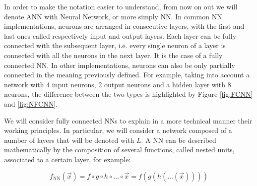 In order to make the notation easier to understand, from now on out we will denote ANN with Neural Network, or more simply NN. In common NN implementations, neurons are arranged in consecutive layers, with the first and last ones called respectively input and output layers. Each layer can be fully connected with the subsequent layer, i.e. every single neuron of a layer is connected with all the neurons in the next layer. It is the case of a fully connected NN. In other implementations, neurons can also be only partially connected in the meaning previously defined. For example, taking into account a network with 4 input neurons, 2 output neurons and a hidden layer with 8 neurons, the difference between the two types is highlighted by Figure \ref{fig:FCNN} and \ref{fig:NFCNN}.

\vspace{5mm}
\begin{minipage}[b]{0.45\linewidth}
    \centering
    
    \label{fig:FCNN}
\end{minipage}
%
\hspace{2mm}
%
\begin{minipage}[b]{0.45\linewidth}
    \centering
    
    \label{fig:NFCNN}
\end{minipage}
\vspace{5mm}

We will consider fully connected NNs to explain in a more technical manner their working principles. In particular, we will consider a network composed of a number of layers that will be denoted with $L$. A NN can be described mathematically by the composition of several functions, called nested units, associated to a certain layer, for example:

\begin{equation}
    f_\mathrm{NN}(\vec{x}) = f \circ g \circ h \circ \dots \circ \vec{x} = f(g(h(\dots(\vec{x}))))
\end{equation}

